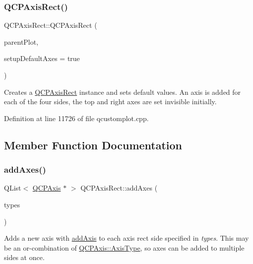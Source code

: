 \subsubsection{\texorpdfstring{Q\+C\+P\+Axis\+Rect()}{QCPAxisRect()}}
{\footnotesize\ttfamily Q\+C\+P\+Axis\+Rect\+::\+Q\+C\+P\+Axis\+Rect (\begin{DoxyParamCaption}\item[{\hyperlink{class_q_custom_plot}{Q\+Custom\+Plot} $\ast$}]{parent\+Plot,  }\item[{bool}]{setup\+Default\+Axes = {\ttfamily true} }\end{DoxyParamCaption})\hspace{0.3cm}{\ttfamily [explicit]}}

Creates a \hyperlink{class_q_c_p_axis_rect}{Q\+C\+P\+Axis\+Rect} instance and sets default values. An axis is added for each of the four sides, the top and right axes are set invisible initially. 

Definition at line 11726 of file qcustomplot.\+cpp.



\subsection{Member Function Documentation}
\mbox{\label{class_q_c_p_axis_rect_a792e1f3d9cb1591fca135bb0de9b81fc}} 
\subsubsection{\texorpdfstring{add\+Axes()}{addAxes()}}
{\footnotesize\ttfamily Q\+List$<$ \hyperlink{class_q_c_p_axis}{Q\+C\+P\+Axis} $\ast$ $>$ Q\+C\+P\+Axis\+Rect\+::add\+Axes (\begin{DoxyParamCaption}\item[{Q\+C\+P\+Axis\+::\+Axis\+Types}]{types }\end{DoxyParamCaption})}

Adds a new axis with \hyperlink{class_q_c_p_axis_rect_a2dc336092ccc57d44a46194c8a23e4f4}{add\+Axis} to each axis rect side specified in {\itshape types}. This may be an {\ttfamily or}-\/combination of \hyperlink{class_q_c_p_axis_ae2bcc1728b382f10f064612b368bc18a}{Q\+C\+P\+Axis\+::\+Axis\+Type}, so axes can be added to multiple sides at once.

